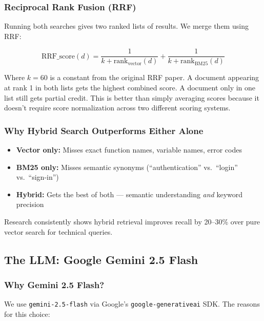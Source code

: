 \documentclass[a4paper,11pt]{article}
\begin{document}
\subsubsection{Reciprocal Rank Fusion (RRF)}
Running both searches gives two ranked lists of results. We merge them using RRF:

\begin{equation}
    \text{RRF\_score}(d) =
    \frac{1}{k + \text{rank}_{\text{vector}}(d)} +
    \frac{1}{k + \text{rank}_{\text{BM25}}(d)}
\end{equation}

Where $k = 60$ is a constant from the original RRF paper. A document appearing at rank 1 in both lists gets the highest combined score. A document only in one list still gets partial credit. This is better than simply averaging scores because it doesn't require score normalization across two different scoring systems.

\subsubsection{Why Hybrid Search Outperforms Either Alone}
\begin{itemize}
    \item \textbf{Vector only:} Misses exact function names, variable names, error codes
    \item \textbf{BM25 only:} Misses semantic synonyms (``authentication'' vs.\ ``login'' vs.\ ``sign-in'')
    \item \textbf{Hybrid:} Gets the best of both --- semantic understanding \textit{and} keyword precision
\end{itemize}

Research consistently shows hybrid retrieval improves recall by 20--30\% over pure vector search for technical queries.

\subsection{The LLM: Google Gemini 2.5 Flash}

\subsubsection{Why Gemini 2.5 Flash?}
We use \texttt{gemini-2.5-flash} via Google's \texttt{google-generativeai} SDK. The reasons for this choice:
\end{document}
